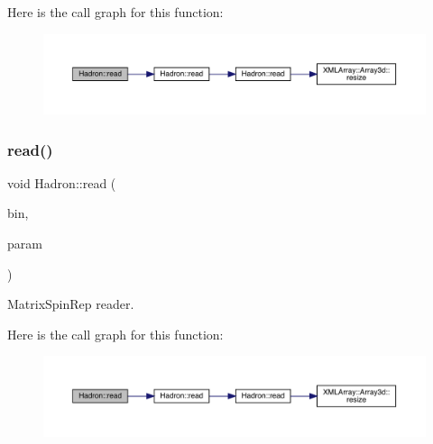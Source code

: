 Here is the call graph for this function\+:\nopagebreak
\begin{figure}[H]
\begin{center}
\leavevmode
\includegraphics[width=350pt]{d1/daf/namespaceHadron_ae5cdeeff0a8ced82bfb5f5a46595faf8_cgraph}
\end{center}
\end{figure}
\mbox{\label{namespaceHadron_af8ce56081c184ce7dd924a192bff08a6}} 
\subsubsection{\texorpdfstring{read()}{read()}\hspace{0.1cm}{\footnotesize\ttfamily [37/94]}}
{\footnotesize\ttfamily void Hadron\+::read (\begin{DoxyParamCaption}\item[{\mbox{\hyperlink{classADATIO_1_1BinaryReader}{Binary\+Reader}} \&}]{bin,  }\item[{\mbox{\hyperlink{structHadron_1_1MatrixSpinRep__t}{Matrix\+Spin\+Rep\+\_\+t}} \&}]{param }\end{DoxyParamCaption})}



Matrix\+Spin\+Rep reader. 

Here is the call graph for this function\+:\nopagebreak
\begin{figure}[H]
\begin{center}
\leavevmode
\includegraphics[width=350pt]{d1/daf/namespaceHadron_af8ce56081c184ce7dd924a192bff08a6_cgraph}
\end{center}
\end{figure}
\mbox{\label{namespaceHadron_a3b1642acb606c69519cf7dd88a01fbfd}} 
